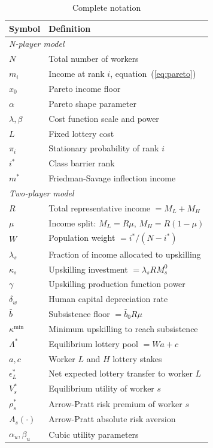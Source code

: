 \documentclass[12pt,a4paper]{article}
\begin{document}
\begin{table}[h!]
\centering
\caption{Complete notation}
\label{tab:notation}
\begin{tabular}{lp{9cm}}
\toprule
Symbol & Definition \\
\midrule
\multicolumn{2}{l}{\textit{N-player model}} \\
$N$ & Total number of workers \\
$m_i$ & Income at rank $i$, equation~(\ref{eq:pareto}) \\
$x_0$ & Pareto income floor \\
$\alpha$ & Pareto shape parameter \\
$\lambda, \beta$ & Cost function scale and power \\
$L$ & Fixed lottery cost \\
$\pi_i$ & Stationary probability of rank $i$ \\
$i^*$ & Class barrier rank \\
$m^*$ & Friedman-Savage inflection income \\
\midrule
\multicolumn{2}{l}{\textit{Two-player model}} \\
$R$ & Total representative income $= M_L + M_H$ \\
$\mu$ & Income split: $M_L = R\mu$, $M_H = R(1-\mu)$ \\
$W$ & Population weight $= i^*/(N-i^*)$ \\
$\lambda_s$ & Fraction of income allocated to upskilling \\
$\kappa_s$ & Upskilling investment $= \lambda_s RM_s^0$ \\
$\gamma$ & Upskilling production function power \\
$\delta_w$ & Human capital depreciation rate \\
$\bar{b}$ & Subsistence floor $= \bar{b}_0 R\mu$ \\
$\kappa^{\min}$ & Minimum upskilling to reach subsistence \\
$\Lambda^*$ & Equilibrium lottery pool $= Wa + c$ \\
$a, c$ & Worker $L$ and $H$ lottery stakes \\
$\epsilon_L^*$ & Net expected lottery transfer to worker $L$ \\
$V_s^*$ & Equilibrium utility of worker $s$ \\
$\rho_s^*$ & Arrow-Pratt risk premium of worker $s$ \\
$A_s(\cdot)$ & Arrow-Pratt absolute risk aversion \\
$\alpha_u, \beta_u$ & Cubic utility parameters \\

\end{tabular}
\end{table}
\end{document}
